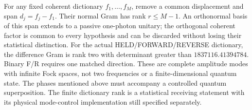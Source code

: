 For any fixed coherent dictionary $f_1,\ldots,f_M$, remove a common
displacement and span $d_j=f_j-f_1$. Their normal Gram has rank
$r\le M-1$. An orthonormal basis of this span extends to a passive
one-photon unitary; the orthogonal coherent factor is common to every
hypothesis and can be discarded without losing their statistical
distinction. For the actual HELD/FORWARD/REVERSE dictionary, the difference
Gram is rank two with determinant greater than
$1837116.41394784$. Binary F/R requires one matched direction.
These are complete amplitude modes with infinite Fock spaces, not two
frequencies or a finite-dimensional quantum state. The phases mentioned
above must accompany a controlled quantum superposition. The finite
dictionary rank is a statistical receiving statement with its physical
mode-control implementation still specified separately.
